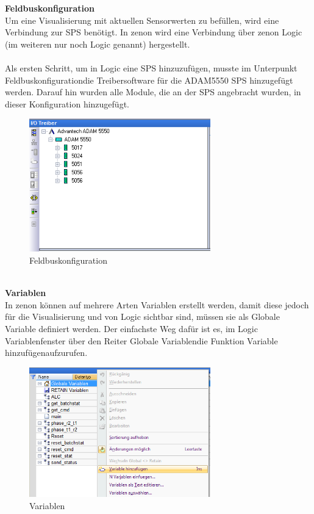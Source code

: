 \textbf{Feldbuskonfiguration}\\
Um eine Visualisierung mit aktuellen Sensorwerten zu befüllen, wird eine Verbindung zur SPS benötigt. In zenon wird eine Verbindung über zenon Logic (im weiteren nur noch Logic genannt) hergestellt.\\
\\
Als ersten Schritt, um in Logic eine SPS hinzuzufügen, musste im Unterpunkt \glqq Feldbuskonfiguration\grqq\space die Treibersoftware für die ADAM5550 SPS hinzugefügt werden. Darauf hin wurden alle Module, die an der SPS angebracht wurden, in dieser Konfiguration hinzugefügt.\\%
\begin{figure}[h!]
  \centering
  \includegraphics[width=0.7\textwidth]{graphics/implementation/Feldbuskonfiguration}
  \caption{Feldbuskonfiguration}%
\end{figure}
\\
\textbf{Variablen}\\
In zenon können auf mehrere Arten Variablen erstellt werden, damit diese jedoch für die Visualisierung und von Logic sichtbar sind, müssen sie als Globale Variable definiert werden. Der einfachste Weg dafür ist es, im Logic Variablenfenster über den Reiter  \glqq Globale Variablen\grqq\space  die Funktion  \glqq Variable hinzufügen\grqq\space  aufzurufen.\\%
\begin{figure}[h!]
  \centering
  \includegraphics[width=0.7\textwidth]{graphics/implementation/Variablen}
  \caption{Variablen}%
\end{figure}\\
